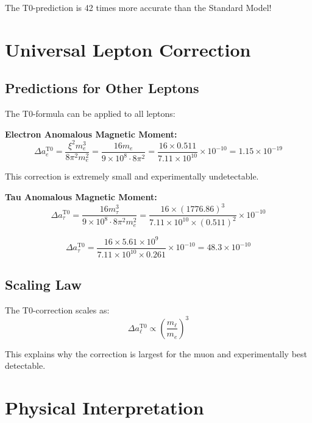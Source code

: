 \documentclass[12pt,a4paper]{report}
\newcommand{\xipar}{\xi}      %
\begin{document}
The T0-prediction is 42 times more accurate than the Standard Model!

	\section{Universal Lepton Correction}\label{sec:universal_lepton_correction}
	
	\subsection{Predictions for Other Leptons}\label{subsec:other_leptons}
	
	The T0-formula can be applied to all leptons:
	
	\textbf{Electron Anomalous Magnetic Moment:}
	\begin{equation}
		\Delta a_e^{\text{T0}} = \frac{\xipar^2 m_e^3}{8\pi^2 m_e^2} = \frac{16 m_e}{9 \times 10^8 \cdot 8\pi^2} = \frac{16 \times 0.511}{7.11 \times 10^{10}} \times 10^{-10} = 1.15 \times 10^{-19}
	\end{equation}
	
	This correction is extremely small and experimentally undetectable.
	
	\textbf{Tau Anomalous Magnetic Moment:}
	\begin{equation}
		\Delta a_\tau^{\text{T0}} = \frac{16 m_\tau^3}{9 \times 10^8 \cdot 8\pi^2 m_e^2} = \frac{16 \times (1776.86)^3}{7.11 \times 10^{10} \times (0.511)^2} \times 10^{-10}
	\end{equation}
	
	\begin{equation}
		\Delta a_\tau^{\text{T0}} = \frac{16 \times 5.61 \times 10^9}{7.11 \times 10^{10} \times 0.261} \times 10^{-10} = 48.3 \times 10^{-10}
	\end{equation}
	
	\subsection{Scaling Law}\label{subsec:scaling_law}
	
	The T0-correction scales as:
	\begin{equation}
		\Delta a_\ell^{\text{T0}} \propto \left(\frac{m_\ell}{m_e}\right)^3
	\end{equation}
	
	This explains why the correction is largest for the muon and experimentally best detectable.
	
	\section{Physical Interpretation}\label{sec:physical_interpretation}
	
\end{document}
